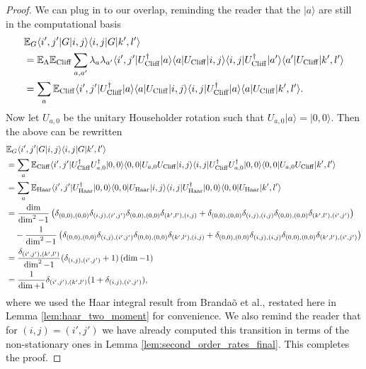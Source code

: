 \documentclass[
 amsmath,amssymb,
 aps,
onecolumn, 
nofootinbib]{revtex4-2}
\newcommand{\ket}[1]{|#1\rangle}
\newcommand{\bra}[1]{\langle #1|}
\newcommand{\parens}[1]{\left( #1 \right)}
\newcommand{\EE}{\mathbb{E}}
\begin{document}
\begin{proof}
We can plug in to our overlap, reminding the reader that the $\ket{a}$ are still in the computational basis 
\begin{align}
    &\EE_G \bra{i', j'} G \ket{i,j}\bra{i,j} G \ket{k', l'} \\
    &= \EE_{\Lambda} \EE_{\rm Cliff} \sum_{a, a'} \lambda_{a} \lambda_{a'} \bra{i',j'} U_{\rm Cliff}^\dagger \ket{a} \bra{a} U_{\rm Cliff} \ket{i,j} \bra{i,j} U_{\rm Cliff}^\dagger \ket{a'} \bra{a'} U_{\rm Cliff} \ket{k',l'} \\
    &= \sum_a \EE_{\rm Cliff}  \bra{i',j'} U_{\rm Cliff}^\dagger \ket{a} \bra{a} U_{\rm Cliff} \ket{i,j} \bra{i,j} U_{\rm Cliff}^\dagger \ket{a} \bra{a} U_{\rm Cliff} \ket{k',l'}.
\end{align}
Now let $U_{a, 0}$ be the unitary Householder rotation such that $U_{a,0} \ket{a} = \ket{0, 0}$. Then the above can be rewritten
\begin{align}
    &\EE_G \bra{i', j'} G \ket{i,j}\bra{i,j} G \ket{k', l'} \\
    &= \sum_a \EE_{\rm Cliff}  \bra{i',j'} U_{\rm Cliff}^\dagger U_{a,0}^\dagger \ket{0,0} \bra{0,0} U_{a,0} U_{\rm Cliff} \ket{i,j} \bra{i,j} U_{\rm Cliff}^\dagger U_{a, 0}^\dagger \ket{0,0} \bra{0,0} U_{a,0} U_{\rm Cliff} \ket{k',l'} \\
    &= \sum_{a} \EE_{\rm Haar} \bra{i',j'} U_{\rm Haar}^\dagger \ket{0, 0} \bra{0,0} U_{\rm Haar} \ket{i,j} \bra{i,j} U_{\rm Haar}^\dagger \ket{0,0} \bra{0,0} U_{\rm Haar} \ket{k', l'} \\
    &= \frac{\dim}{\dim^2 - 1} \parens{\delta_{(0,0), (0,0)} \delta_{(i, j), (i',j')} \delta_{(0,0), (0,0)} \delta_{(k',l'), (i,j)} + \delta_{(0,0), (0,0)} \delta_{(i,j), (i,j)} \delta_{(0,0), (0,0)} \delta_{(k', l'), (i', j')}} \nonumber \\
    &\quad - \frac{1}{\dim^2 - 1} \parens{\delta_{(0, 0), (0, 0)} \delta_{(i, j), (i', j')} \delta_{(0,0), (0,0)} \delta_{(k', l'), (i,j)} + \delta_{(0,0), (0,0)} \delta_{(i,j),(i,j)} \delta_{(0,0), (0,0)} \delta_{(k', l'), (i',j')}} \\
    &= \frac{\delta_{(i',j'), (k', l')}}{\dim^2 - 1} (\delta_{(i,j), (i',j')} + 1) \left( \dim - 1  \right) \\
    &= \frac{1}{\dim + 1} \delta_{(i', j'), (k', l')} (1 + \delta_{(i,j), (i', j')}),
\end{align}
where we used the Haar integral result from Brandaõ et al., restated here in Lemma \ref{lem:haar_two_moment} for convenience. We also remind the reader that for $(i,j) = (i',j')$ we have already computed this transition in terms of the non-stationary ones in Lemma \ref{lem:second_order_rates_final}. This completes the proof.

\end{proof}
\end{document}
